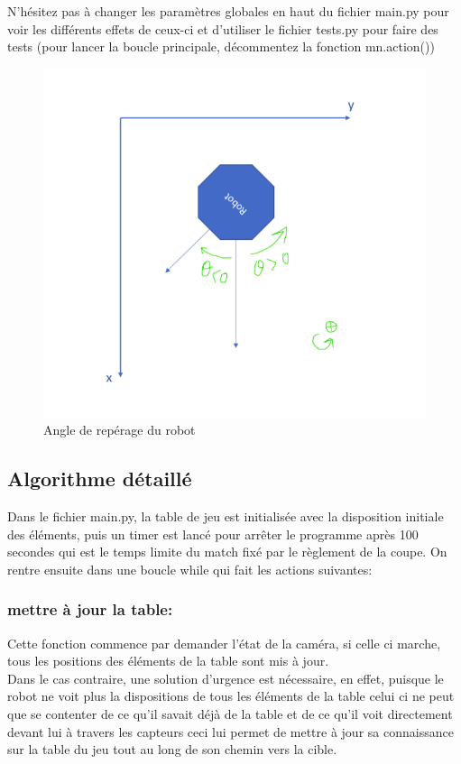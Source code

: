 \documentclass{article}
\begin{document}
N'hésitez pas à changer les paramètres globales en haut du fichier main.py pour voir les différents effets de ceux-ci et d'utiliser le fichier tests.py pour faire des tests (pour lancer la boucle principale, décommentez la fonction mn.action())
\begin{figure}[!h]
\centering
\includegraphics[scale=0.5]{theta}
\caption{Angle de repérage du robot}
\label{fig:theta}
\end{figure}

\subsection{Algorithme détaillé}

Dans le fichier main.py, la table de jeu est initialisée avec la disposition initiale des éléments, puis un timer est lancé pour arrêter le programme après 100 secondes qui est le temps limite du match fixé par le règlement de la coupe. On rentre ensuite dans une boucle while qui fait les actions suivantes:
\subsubsection{mettre à jour la table:}
Cette fonction commence par demander l'état de la caméra, si celle ci marche, tous les positions des éléments de la table sont mis à jour. \\ Dans le cas contraire, une solution d'urgence est nécessaire, en effet, puisque le robot ne voit plus la dispositions de tous les éléments de la table celui ci ne peut que se contenter de ce qu'il savait déjà de la table et de ce qu'il voit directement devant lui à travers les capteurs ceci lui permet de mettre à jour sa connaissance sur la table du jeu tout au long de son chemin vers la cible.
\end{document}
